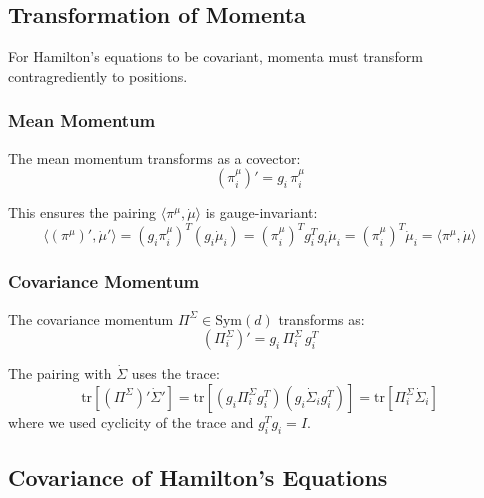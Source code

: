 \documentclass[12pt]{article}
\begin{document}
\subsection{Transformation of Momenta}

For Hamilton's equations to be covariant, momenta must transform contragrediently to positions.

\subsubsection{Mean Momentum}

The mean momentum transforms as a covector:
\begin{equation}
\boxed{(\pi_i^\mu)' = g_i \, \pi_i^\mu}
\end{equation}

This ensures the pairing $\langle\pi^\mu, \dot{\mu}\rangle$ is gauge-invariant:
\begin{equation}
\langle(\pi^\mu)', \dot{\mu}'\rangle = (g_i\pi_i^\mu)^T(g_i\dot{\mu}_i) = (\pi_i^\mu)^T g_i^T g_i \dot{\mu}_i = (\pi_i^\mu)^T\dot{\mu}_i = \langle\pi^\mu, \dot{\mu}\rangle
\end{equation}

\subsubsection{Covariance Momentum}

The covariance momentum $\Pi^\Sigma \in \mathrm{Sym}(d)$ transforms as:
\begin{equation}
\boxed{(\Pi_i^\Sigma)' = g_i \, \Pi_i^\Sigma \, g_i^T}
\end{equation}

The pairing with $\dot{\Sigma}$ uses the trace:
\begin{equation}
\mathrm{tr}[(\Pi^\Sigma)'\dot{\Sigma}'] = \mathrm{tr}[(g_i\Pi_i^\Sigma g_i^T)(g_i\dot{\Sigma}_i g_i^T)] = \mathrm{tr}[\Pi_i^\Sigma\dot{\Sigma}_i]
\end{equation}
where we used cyclicity of the trace and $g_i^T g_i = I$.

\subsection{Covariance of Hamilton's Equations}
\end{document}
